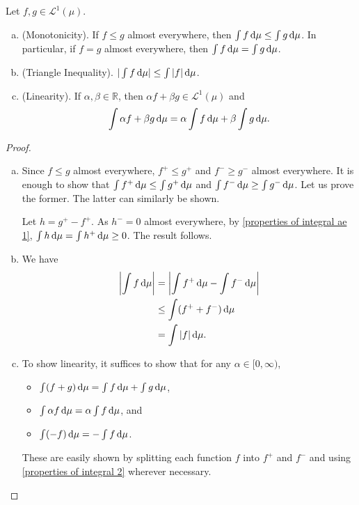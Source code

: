 \begin{theorem}
\label{properties of integral final}
    Let $f,g\in\mathcal{L}^1(\mu)$.
    \begin{enumerate}[(a)]
        \item (Monotonicity). If $f\leq g$ almost everywhere, then $\int f\operatorname{d}\!{\mu}\leq \int g\operatorname{d}\!{\mu}$. In particular, if $f=g$ almost everywhere, then $\int f\operatorname{d}\!{\mu}= \int g\operatorname{d}\!{\mu}$.
        \item (Triangle Inequality). $|\int f\operatorname{d}\!{\mu}|\leq \int |f|\operatorname{d}\!{\mu}$.
        \item (Linearity). If $\alpha,\beta\in\mathbb{R}$, then $\alpha f+\beta g\in\mathcal{L}^1(\mu)$ and
        $$\int \alpha f+ \beta g\operatorname{d}\!{\mu} = \alpha\int f\operatorname{d}\!{\mu} + \beta\int g\operatorname{d}\!{\mu}.$$
    \end{enumerate}
\end{theorem}
\begin{proof}
    ~
    \begin{enumerate}[(a)]
        \item Since $f\leq g$ almost everywhere, $f^+\leq g^+$ and $f^-\geq g^-$ almost everywhere. It is enough to show that $\int f^+\operatorname{d}\!{\mu}\leq \int g^+\operatorname{d}\!{\mu}$ and $\int f^-\operatorname{d}\!{\mu}\geq \int g^-\operatorname{d}\!{\mu}$. Let us prove the former. The latter can similarly be shown.
        
        Let $h=g^+-f^+$. As $h^-=0$ almost everywhere, by \cref{properties of integral ae 1}, $\int h\operatorname{d}\!{\mu}=\int h^+\operatorname{d}\!{\mu}\geq 0$. The result follows.
        
        \item We have
        \begin{align*}
            \left|\int f\operatorname{d}\!{\mu}\right| &= \left|\int f^+\operatorname{d}\!{\mu} - \int f^-\operatorname{d}\!{\mu}\right| \\
            &\leq \int (f^+ + f^-)\operatorname{d}\!{\mu} \\ &= \int |f|\operatorname{d}\!{\mu}.
        \end{align*}
        
        \item To show linearity, it suffices to show that for any $\alpha\in[0,\infty)$,
        \begin{itemize}
            \item $\int (f+g)\operatorname{d}\!{\mu} = \int f\operatorname{d}\!{\mu} + \int g\operatorname{d}\!{\mu}$,
            \item $\int \alpha f\operatorname{d}\!{\mu} = \alpha\int f\operatorname{d}\!{\mu}$, and
            \item $\int (-f)\operatorname{d}\!{\mu} = -\int f\operatorname{d}\!{\mu}$.
        \end{itemize}
        These are easily shown by splitting each function $f$ into $f^+$ and $f^-$ and using \cref{properties of integral 2} wherever necessary.
    \end{enumerate}
\end{proof}

